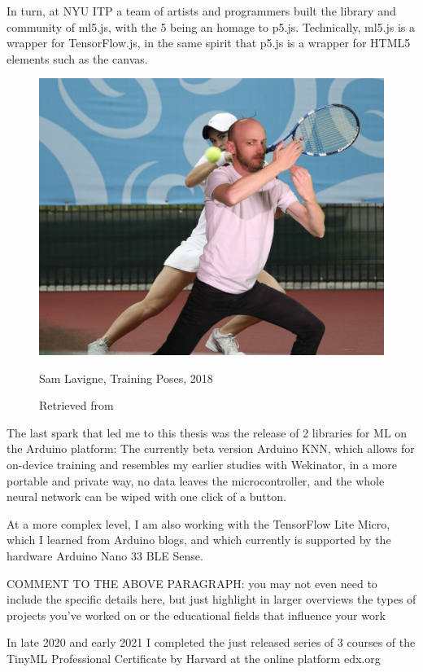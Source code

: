 In turn, at \acrshort{NYU} \acrshort{ITP} a team of artists and programmers built the library and community of ml5.js, with the 5 being an homage to p5.js. Technically, ml5.js is a wrapper for TensorFlow.js, in the same spirit that p5.js is a wrapper for HTML5 elements such as the canvas.

\begin{figure}[ht]
  \centering
    \includegraphics[width=0.75\linewidth,height=0.25\textheight,keepaspectratio]{images/sam-lavigne-training-poses.jpg}
  \caption{Sam Lavigne, Training Poses, 2018}
  \caption*{Retrieved from \cite{website-sam-lavigne-training-poses}}
  \label{fig:sam-lavigne-training-poses}
\end{figure}

The last spark that led me to this thesis was the release of 2 libraries for \acrshort{ML} on the Arduino platform: The currently beta version Arduino KNN, which allows for on-device training and resembles my earlier studies with Wekinator, in a more portable and private way, no data leaves the microcontroller, and the whole neural network can be wiped with one click of a button.

At a more complex level, I am also working with the TensorFlow Lite Micro, which I learned from Arduino blogs, and which currently is supported by the hardware Arduino Nano 33 \acrshort{BLE} Sense.

COMMENT TO THE ABOVE PARAGRAPH: you may not even need to include the specific details here, but just highlight in larger overviews the types of projects you've worked on or the educational fields that influence your work

In late 2020 and early 2021 I completed the just released series of 3 courses of the TinyML Professional Certificate by Harvard at the online platform edx.org

